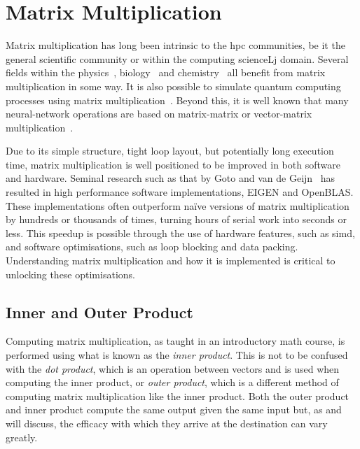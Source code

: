 \documentclass[\main/thesis.tex]{subfiles}
\begin{document}
\chapter{Matrix Multiplication}
\label{cha:matmul}
Matrix multiplication has long been intrinsic to the \gls{hpc} communities, be it the general scientific community or within the computing scienceLj domain.
Several fields within the physics~\autocite{krol2014matrix}, biology~\autocite{akutsu2000algorithms} and chemistry~\autocite{weber2015semiempirical} all benefit from matrix multiplication in some way.
It is also possible to simulate quantum computing processes using matrix multiplication~\autocite{zulehner2019matrix}.
Beyond this, it is well known that many neural-network operations are based on matrix-matrix or vector-matrix multiplication~\autocite{rojas1996neural,blue1992training}.

Due to its simple structure, tight loop layout, but potentially long execution time, matrix multiplication is well positioned to be improved in both software and hardware.
Seminal research such as that by Goto and van de Geijn~\autocite{goto2008anatomy} has resulted in high performance software implementations, \eg EIGEN and OpenBLAS.
These implementations often outperform na\"ive versions of matrix multiplication by hundreds or thousands of times, turning hours of serial work into seconds or less.
This speedup is possible through the use of hardware features, such as \gls{simd}, and software optimisations, such as loop blocking and data packing.
Understanding matrix multiplication and how it is implemented is critical to unlocking these optimisations.

\section{Inner and Outer Product}
\label{sec:products}

Computing matrix multiplication, as taught in an introductory math course, is performed using what is known as the \emph{inner product}.
This is not to be confused with the \emph{dot product}, which is an operation between vectors and is used when computing the inner product, or \emph{outer product}, which is a different method of computing matrix multiplication like the inner product.
Both the outer product and inner product compute the same output given the same input but, as  and  will discuss, the efficacy with which they arrive at the destination can vary greatly.
\end{document}
